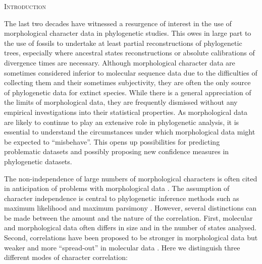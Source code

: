\documentclass[12pt,letterpaper]{article}
\renewcommand{\section}[1]{%
\bigskip
\begin{center}
\begin{Large}
\normalfont\scshape #1
\medskip
\end{Large}
\end{center}}
\begin{document}
\section{Introduction}
The last two decades have witnessed a resurgence of interest in the use of morphological character data in phylogenetic studies.
This owes in large part to the use of fossils to undertake at least partial reconstructions of phylogenetic trees, especially where ancestral states reconstructions or absolute calibrations of divergence times are necessary. 
Although morphological character data are sometimes considered inferior to molecular sequence data due to the difficulties of collecting them and their sometimes subjectivity, they are often the only source of phylogenetic data for extinct species.
While there is a general appreciation of the limits of morphological data, they are frequently dismissed without any empirical investigations into their statistical properties.
As morphological data are likely to continue to play an extensive role in phylogenetic analysis, it is essential to understand the circumstances under which morphological data might be expected to ``misbehave''.
This opens up possibilities for predicting problematic datasets and possibly proposing new confidence measures in phylogenetic datasets.

The non-independence of large numbers of morphological characters is often cited in anticipation of problems with morphological data \cite[e.g.][]{Davalos01072014, ZouConvergence}.
The assumption of character independence is central to phylogenetic inference methods such as maximum likelihood and maximum parsimony \citep[e.g.][]{joysey1982problems,felsenstein1985phylogenies,lewisa2001,felsenstein2004inferring}.
However, several distinctions can be made between the amount and the nature of the correlation.
First, molecular and morphological data often differs in size and in the number of states analysed.
Second, correlations have been proposed to be stronger in morphological data
but weaker and more ``spread-out'' in molecular data \citep[][]{huelsenbeck1999effect}. %
Here we distinguish three different modes of character correlation:
\end{document}
